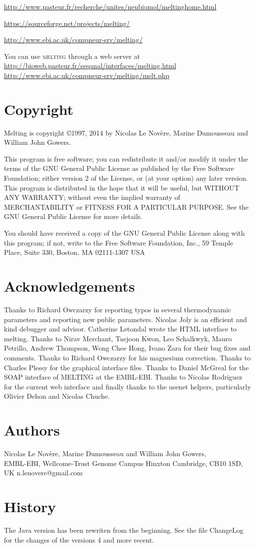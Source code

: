 \documentclass{article}
\begin{document}
\url{http://www.pasteur.fr/recherche/unites/neubiomol/meltinghome.html} 

\url{https://sourceforge.net/projects/melting/}

\url{http://www.ebi.ac.uk/compneur-srv/melting/}
  
You can use \textsc{melting} through a web server at 
\url{http://bioweb.pasteur.fr/seqanal/interfaces/melting.html}
\url{http://www.ebi.ac.uk/compneur-srv/melting/melt.php}   
   
\section{Copyright }
Melting is copyright 
\copyright 1997, 2014 by Nicolas Le Nov\`ere, Marine Dumousseau and William John Gowers.

This program is free software; 
you can redistribute it and/or modify it under the terms of the GNU General 
Public License as published by the Free Software Foundation; either version 
2 of the License, or (at your option) any later version.   
  This program 
is distributed in the hope that it will be useful, but WITHOUT ANY WARRANTY; 
without even the implied warranty of MERCHANTABILITY or FITNESS FOR A 
PARTICULAR PURPOSE.  See the GNU General Public License for more details. 
  
  You should have received a copy of the GNU General Public License 
along with this program; if not, write to the Free Software Foundation, 
Inc., 59 Temple Place, Suite 330, Boston, MA  02111-1307 USA   
   
\section{Acknowledgements}
Thanks to Richard Owczarzy for reporting typos in several thermodynamic parameters and reporting new public parameters.
Nicolas Joly is an efficient and kind debugger and advisor. Catherine
Letondal wrote the HTML interface to melting. Thanks to Nirav Merchant,
Taejoon Kwon, Leo Schalkwyk, Mauro Petrillo, Andrew Thompson, Wong Chee Hong, Ivano
Zara for their bug fixes and comments. Thanks to Richard Owczarzy for his magnesium 
correction. Thanks to Charles Plessy for the graphical interface files. Thanks to Daniel McGreal for the SOAP interface of MELTING at the EMBL-EBI. Thanks to Nicolas Rodriguez for the current web interface and finally thanks
to the usenet helpers, particularly Olivier Dehon and Nicolas Chuche.

   
\section{Authors }
Nicolas Le Nov\`ere, Marine Dumousseau and William John Gowers, \\
EMBL-EBI, 
Wellcome-Trust Genome Campus
Hinxton Cambridge, CB10 1SD, UK
n.lenovere@gmail.com
  
\section{History }

The Java version has been rewriten from the beginning.
See the file ChangeLog for the changes of the versions 4 and more recent.
\end{document}
